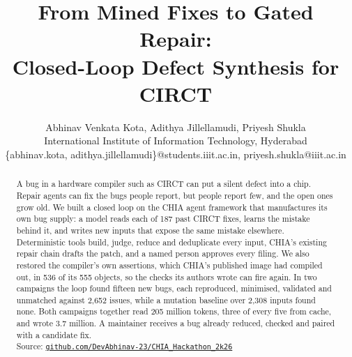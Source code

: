 \documentclass[conference]{IEEEtran}
\begin{document}
\title{From Mined Fixes to Gated Repair:\\Closed-Loop Defect Synthesis for CIRCT}

\author{
  Abhinav Venkata Kota, Adithya Jillellamudi, Priyesh Shukla \\
  International Institute of Information Technology, Hyderabad \\
  \{abhinav.kota, adithya.jillellamudi\}@students.iiit.ac.in, priyesh.shukla@iiit.ac.in
}

\maketitle

\begin{abstract}
A bug in a hardware compiler such as CIRCT can put a silent defect into a chip.
Repair agents can fix the bugs people report, but people report few, and the
open ones grow old. We built a closed loop on the CHIA agent framework that
manufactures its own bug supply: a model reads each of 187 past CIRCT fixes, %
learns the mistake behind it, and writes new inputs that expose the same mistake
elsewhere. Deterministic tools build, judge, reduce and deduplicate every input,
CHIA's existing repair chain drafts the patch, and a named person approves every
filing. We also restored the compiler's own assertions, which CHIA's published
image had compiled out, in 536 of its 555 objects, %
so the checks its authors wrote can fire again. In two campaigns the
loop found fifteen new bugs, each reproduced, minimised, validated and unmatched
against 2,652 issues, %
while a mutation baseline over 2,308 inputs found none. %
Both campaigns together read 205 million tokens, three of every five from cache,
and wrote 3.7 million. %
A maintainer receives a bug already reduced, checked and paired with a candidate
fix. \\
Source: \href{https://github.com/DevAbhinav-23/CHIA_Hackathon_2k26}{\nolinkurl{github.com/DevAbhinav-23/CHIA_Hackathon_2k26}}
\end{abstract}
\end{document}
